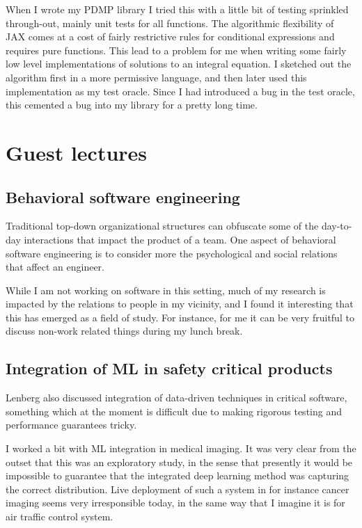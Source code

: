 \documentclass[11pt]{diazessay}
\begin{document}
When I wrote my PDMP library I tried this with a little bit of testing sprinkled through-out, mainly unit tests for all functions. The algorithmic flexibility of JAX comes at a cost of fairly restrictive rules for conditional expressions and requires pure functions. This lead to a problem for me when writing some fairly low level implementations of solutions to an integral equation. I sketched out the algorithm first in a more permissive language, and then later used this implementation as my test oracle. Since I had introduced a bug in the test oracle, this cemented a bug into my library for a pretty long time. 


\section*{Guest lectures}


\subsection*{Behavioral software engineering}


Traditional top-down organizational structures can obfuscate some of the day-to-day interactions that impact the product of a team. One aspect of behavioral software engineering is to consider more the psychological and social relations that affect an engineer\cite{lenberg2015behavioral}.

While I am not working on software in this setting, much of my research is impacted by the relations to people in my vicinity, and I found it interesting that this has emerged as a field of study.
For instance, for me it can be very fruitful to discuss non-work related things during my lunch break.


\subsection*{Integration of ML in safety critical products}

Lenberg also discussed integration of data-driven techniques in critical software, something which at the moment is difficult due to making rigorous testing and performance guarantees tricky.

I worked a bit with ML integration in medical imaging. It was very clear from the outset that this was an exploratory study, in the sense that presently it would be impossible to guarantee that the integrated deep learning method was capturing the correct distribution. Live deployment of such a system in for instance cancer imaging seems very irresponsible today, in the same way that I imagine it is for air traffic control system.
\end{document}
